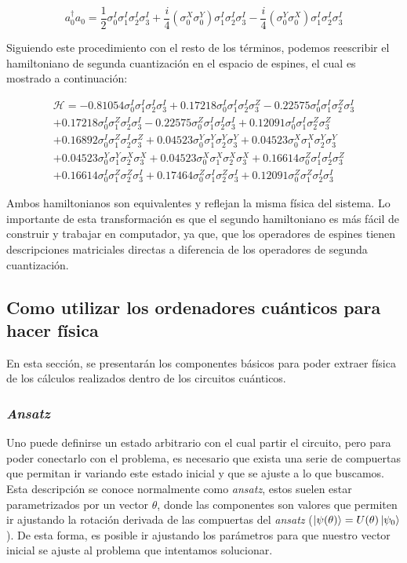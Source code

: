 \begin{equation*}
    a_0^{\dag} a_0 = \frac{1}{2}\sigma^I_0\sigma^I_1\sigma^I_2\sigma^I_3 + \frac{i}{4}(\sigma^X_0\sigma^Y_0)\sigma^I_1\sigma^I_2\sigma^I_3 - \frac{i}{4}(\sigma^Y_0\sigma^X_0)\sigma^I_1\sigma^I_2\sigma^I_3
\end{equation*}


Siguiendo este procedimiento con el resto de los términos, podemos reescribir el hamiltoniano de segunda cuantización en el espacio de espines, el cual es mostrado a continuación:

\begin{multline*}
\mathcal{H} = -0.81054\sigma_0^I\sigma_1^I\sigma_2^I\sigma_3^I + 0.17218\sigma_0^I\sigma_1^I\sigma_2^I\sigma_3^Z - 0.22575\sigma_0^I\sigma_1^I\sigma_2^Z\sigma_3^I \\
+ 0.17218\sigma_0^I\sigma_1^Z\sigma_2^I\sigma_3^I - 0.22575\sigma_0^Z\sigma_1^I\sigma_2^I\sigma_3^I + 0.12091\sigma_0^I\sigma_1^I\sigma_2^Z\sigma_3^Z \\
+ 0.16892\sigma_0^I\sigma_1^Z\sigma_2^I\sigma_3^Z + 0.04523\sigma_0^Y\sigma_1^Y\sigma_2^Y\sigma_3^Y + 0.04523\sigma_0^X\sigma_1^X\sigma_2^Y\sigma_3^Y \\
+ 0.04523\sigma_0^Y\sigma_1^Y\sigma_2^X\sigma_3^X + 0.04523\sigma_0^X\sigma_1^X\sigma_2^X\sigma_3^X + 0.16614\sigma_0^Z\sigma_1^I\sigma_2^I\sigma_3^Z \\
+ 0.16614\sigma_0^I\sigma_1^Z\sigma_2^Z\sigma_3^I + 0.17464\sigma_0^Z\sigma_1^I\sigma_2^Z\sigma_3^I + 0.12091\sigma_0^Z\sigma_1^Z\sigma_2^I\sigma_3^I
\end{multline*}

Ambos hamiltonianos son equivalentes y reflejan la misma física del sistema. Lo importante de esta transformación es que el segundo hamiltoniano es más fácil de construir y trabajar en computador, ya que, que los operadores de espines tienen descripciones matriciales directas a diferencia de los operadores de segunda cuantización.


%
%
%
%
%
\subsection{Como utilizar los ordenadores cuánticos para hacer física}
En esta sección, se presentarán los componentes básicos para poder extraer física de los cálculos realizados dentro de los circuitos cuánticos.

\subsubsection{\textit{Ansatz}}
Uno puede definirse un estado arbitrario con el cual partir el circuito, pero para poder conectarlo con el problema, es necesario que exista una serie de compuertas que permitan ir variando este estado inicial y que se ajuste a lo que buscamos. Esta descripción se conoce normalmente como \textit{ansatz}, estos suelen estar parametrizados por un vector $\theta$, donde las componentes son valores que permiten ir ajustando la rotación derivada de las compuertas del \textit{ansatz} ($\ket{\psi(\theta)} = U(\theta)\ket{\psi_0}$). De esta forma, es posible ir ajustando los parámetros para que nuestro vector inicial se ajuste al problema que intentamos solucionar. 

